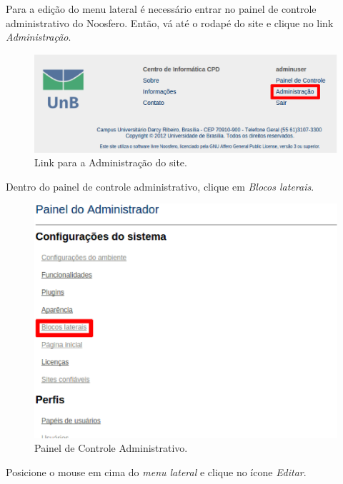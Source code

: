 Para a edição do menu lateral é necessário entrar no painel de controle administrativo do Noosfero. Então, vá até o rodapé do site e clique no link \emph{\color{red}Administração}.

\begin{figure}[h]
     \centering
       \includegraphics[keepaspectratio=true,scale=0.6]{figuras/linkAdmin.eps}
     \caption{Link para a Administração do site.}
     \label{fig:linkAdmin}
\end{figure}

\newpage
Dentro do painel de controle administrativo, clique em \emph{\color{red}Blocos laterais}.

\begin{figure}[h]
     \centering
       \includegraphics[keepaspectratio=true,scale=0.4]{figuras/administracao.eps}
     \caption{Painel de Controle Administrativo.}
     \label{fig:painelAdministrativo}
\end{figure}

Posicione o mouse em cima do \emph{\color{red}menu lateral} e clique no ícone \emph{\color{green}Editar}.

